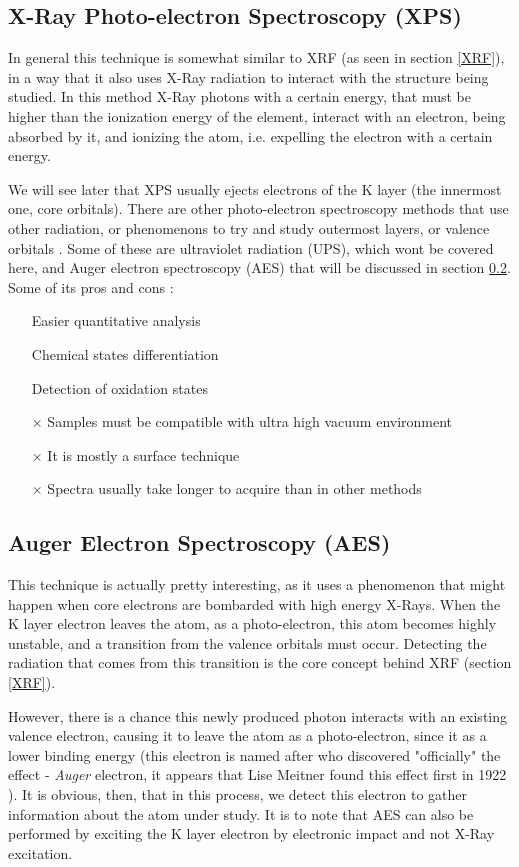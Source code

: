 \documentclass[]{report}
\begin{document}
\subsection{X-Ray Photo-electron Spectroscopy (XPS)} \label{XPS}
In general this technique is somewhat similar to XRF (as seen in section \ref{XRF}), in a way that it also uses X-Ray radiation to interact with the structure being studied. In this method X-Ray photons with a certain energy, that must be higher than the ionization energy of the element, interact with an electron, being absorbed by it, and ionizing the atom, i.e. expelling the electron with a certain energy.
\par We will see later that XPS usually ejects electrons of the K layer (the innermost one, core orbitals). There are other photo-electron spectroscopy methods that use other radiation, or phenomenons  to try and study outermost layers, or valence orbitals \cite{JMH_Modern}. Some of these are ultraviolet radiation (UPS), which wont be covered here, and Auger electron spectroscopy (AES) that will be discussed in section \ref{AES}.\\

Some of its pros and cons \cite{CL_XPS}:
\begin{itemize}
\item[\checkmark] Easier quantitative analysis
\item[\checkmark] Chemical states differentiation
\item[\checkmark] Detection of oxidation states
\item[$\times$] Samples must be compatible with ultra high vacuum environment
\item[$\times$] It is mostly a surface technique
\item[$\times$] Spectra usually take longer to acquire than in other methods
\end{itemize}

\subsection{Auger Electron Spectroscopy (AES)} \label{AES}
This technique is actually pretty interesting, as it uses a phenomenon that might happen when core electrons are bombarded with high energy X-Rays. When the K layer electron leaves the atom, as a photo-electron, this atom becomes highly unstable, and a transition from the valence orbitals must occur. Detecting the radiation that comes from this transition is the core concept behind XRF (section \ref{XRF}). 
\par However, there is a chance this newly produced photon interacts with an existing valence electron, causing it to leave the atom as a photo-electron, since it as a lower binding energy (this electron is named after who discovered "officially" the effect - \textit{Auger} electron, it appears that Lise Meitner found this effect first in 1922 \cite{AU_Wiki}). It is obvious, then, that in this process, we detect this electron to gather information about the atom under study. It is to note that AES can also be performed by exciting the K layer electron by electronic impact and not X-Ray excitation.\\
\end{document}
